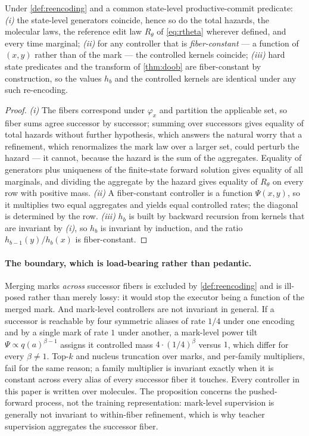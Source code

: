 \begin{proposition}
\label{prop:encoding}
Under \cref{def:reencoding} and a common state-level productive-commit predicate:
\emph{(i)} the state-level generators coincide, hence so do the total hazards, the molecular laws, the reference edit law $R_\theta$ of \eqref{eq:rtheta} wherever defined, and every time marginal;
\emph{(ii)} for any controller that is \emph{fiber-constant} --- a function of $(x,y)$ rather than of the mark --- the controlled kernels coincide;
\emph{(iii)} hard state predicates and the transform of \cref{thm:doob} are fiber-constant by construction, so the values $h_b$ and the controlled kernels are identical under any such re-encoding.
\end{proposition}

\begin{proof}[Proof]
\emph{(i)} The fibers correspond under $\varphi_x$ and partition the applicable set, so fiber sums agree successor by successor; summing over successors gives equality of total hazards without further hypothesis, which answers the natural worry that a refinement, which renormalizes the mark law over a larger set, could perturb the hazard --- it cannot, because the hazard is the sum of the aggregates. Equality of generators plus uniqueness of the finite-state forward solution gives equality of all marginals, and dividing the aggregate by the hazard gives equality of $R_\theta$ on every row with positive mass.
\emph{(ii)} A fiber-constant controller is a function $\Psi(x,y)$, so it multiplies two equal aggregates and yields equal controlled rates; the diagonal is determined by the row.
\emph{(iii)} $h_b$ is built by backward recursion from kernels that are invariant by \emph{(i)}, so $h_b$ is invariant by induction, and the ratio $h_{b-1}(y)/h_b(x)$ is fiber-constant.
\end{proof}

\paragraph{The boundary, which is load-bearing rather than pedantic.}
Merging marks \emph{across} successor fibers is excluded by \cref{def:reencoding} and is ill-posed rather than merely lossy: it would stop the executor being a function of the merged mark.
And mark-level controllers are not invariant in general.
If a successor is reachable by four symmetric aliases of rate $1/4$ under one encoding and by a single mark of rate $1$ under another, a mark-level power tilt $\Psi\propto q(a)^{\beta-1}$ assigns it controlled mass $4\cdot(1/4)^\beta$ versus $1$, which differ for every $\beta\ne1$.
Top-$k$ and nucleus truncation over marks, and per-family multipliers, fail for the same reason; a family multiplier is invariant exactly when it is constant across every alias of every successor fiber it touches.
Every controller in this paper is written over molecules.
The proposition concerns the pushed-forward process, not the training representation: mark-level supervision is generally not invariant to within-fiber refinement, which is why teacher supervision aggregates the successor fiber.

